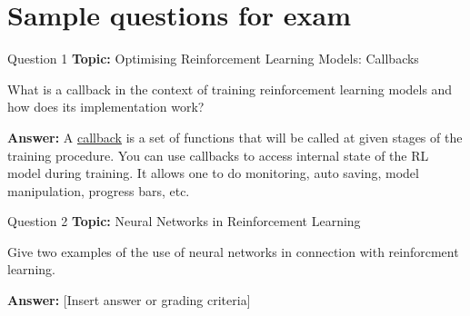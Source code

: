 \section{Sample questions for exam}

\begin{frame}{Question 1}
    \textbf{Topic:} Optimising Reinforcement Learning Models: Callbacks

    \vspace{10pt}

    What is a callback in the context of training reinforcement learning models and how does its implementation work?

    \vspace{20pt}

    \textbf{Answer:} A \href{https://stable-baselines3.readthedocs.io/en/master/guide/callbacks.html}{callback} is a set of functions that will be called at given stages of the training procedure. You can use callbacks to access internal state of the RL model during training. It allows one to do monitoring, auto saving, model manipulation, progress bars, etc.

\end{frame}

\begin{frame}{Question 2}
    \textbf{Topic:} Neural Networks in Reinforcement Learning
    \vspace{10pt}

    Give two examples of the use of neural networks in connection with reinforcment learning.

    \vspace{20pt}

    \textbf{Answer:} [Insert answer or grading criteria]
\end{frame}


